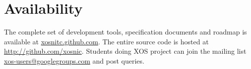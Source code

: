 \documentclass[10pt]{report}
\begin{document}
\section{Availability}
The complete set of development tools, specification documents and roadmap is available at \url{xosnitc.github.com}. The entire source code is hosted at \url{http://github.com/xosnic}. Students doing XOS project can join the mailing list \url{xos-users@googlegroups.com} and post queries.




%
%
\end{document}

